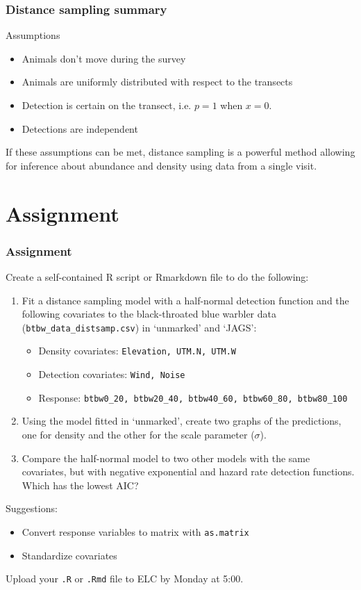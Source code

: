 \documentclass[color=usenames,dvipsnames]{beamer}\usepackage[]{graphicx}\usepackage[]{color}
\newcommand{\inr}[1]{\colorbox{inlinecolor}{\texttt{#1}}}
\begin{document}
\begin{frame}
  \frametitle{Distance sampling summary}
  Assumptions
  \begin{itemize}
    \small
    \item Animals don't move during the survey
    \item Animals are uniformly distributed with respect to the
      transects
    \item Detection is certain on the transect, i.e. $p=1$ when $x=0$. 
    \item Detections are independent
  \end{itemize}
  \pause
  \vfill
  \small
  If these assumptions can be met, distance sampling is a powerful
  method allowing for inference about abundance and density using data
  from a single visit. \\
\end{frame}




\section{Assignment}




\begin{frame}[fragile]
  \frametitle{Assignment}
  \footnotesize
  Create a self-contained R script or Rmarkdown file to do the following:
  \vfill
  \begin{enumerate}
    \footnotesize
    \item Fit a distance sampling model with a half-normal detection
      function and the following covariates to the black-throated blue
      warbler data ({\tt btbw\_data\_distsamp.csv}) in `unmarked' and
      `JAGS':   
      \begin{itemize}
        \footnotesize
        \item Density covariates: {\tt Elevation, UTM.N, UTM.W}
        \item Detection covariates: {\tt Wind, Noise}
        \item Response: {\scriptsize \tt btbw0\_20, btbw20\_40, btbw40\_60, btbw60\_80, btbw80\_100}
      \end{itemize}
    \item Using the model fitted in `unmarked', create two graphs of
      the predictions, one for density and the other for the scale
      parameter ($\sigma$).
    \item Compare the half-normal model to two other models with the
      same covariates, but with negative exponential and hazard
      rate detection functions. Which has the lowest AIC? 
  \end{enumerate}
  \pause
  \vfill
  Suggestions:
  \begin{itemize}
    \item Convert response variables to matrix with \inr{as.matrix}
    \item Standardize covariates
  \end{itemize}
  \pause
  \vfill
  Upload your {\tt .R} or {\tt .Rmd} file to ELC by Monday at 5:00. 
\end{frame}
\end{document}
